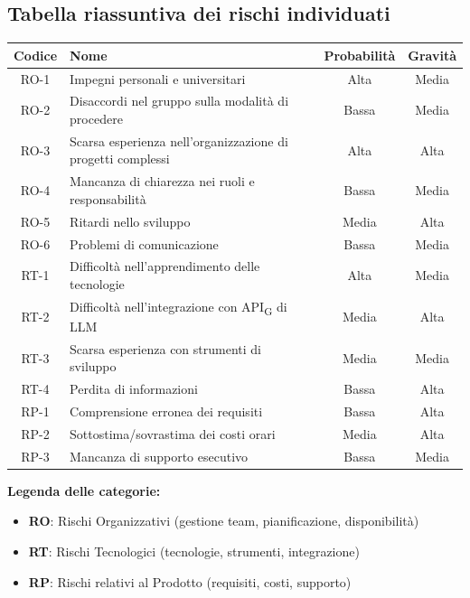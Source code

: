 \documentclass[11pt,a4paper]{article}
\newcommand{\gls}[1]{#1\textsubscript{G}}
\begin{document}
\subsection{Tabella riassuntiva dei rischi individuati}
\begin{center}
    \begin{tabular}{|c|l|c|c|}
        \hline
        \textbf{Codice} & \textbf{Nome} & \textbf{Probabilità} & \textbf{Gravità} \\
        \hline
        RO-1 & Impegni personali e universitari & Alta & Media \\
        \hline
        RO-2 & Disaccordi nel gruppo sulla modalità di procedere & Bassa & Media \\
        \hline
        RO-3 & Scarsa esperienza nell'organizzazione di progetti complessi & Alta & Alta \\
        \hline
        RO-4 & Mancanza di chiarezza nei ruoli e responsabilità & Bassa & Media \\
        \hline
        RO-5 & Ritardi nello sviluppo & Media & Alta \\
        \hline
        RO-6 & Problemi di comunicazione & Bassa & Media \\
        \hline
        RT-1 & Difficoltà nell'apprendimento delle tecnologie & Alta & Media \\
        \hline
        RT-2 & Difficoltà nell'integrazione con \gls{API} di LLM & Media & Alta \\
        \hline
        RT-3 & Scarsa esperienza con strumenti di sviluppo & Media & Media \\
        \hline
        RT-4 & Perdita di informazioni & Bassa & Alta \\
        \hline
        RP-1 & Comprensione erronea dei requisiti & Bassa & Alta \\
        \hline
        RP-2 & Sottostima/sovrastima dei costi orari & Media & Alta \\
        \hline
        RP-3 & Mancanza di supporto esecutivo & Bassa & Media \\
        \hline
    \end{tabular}
\end{center}

\textbf{Legenda delle categorie:}
\begin{itemize}
    \item \textbf{RO}: Rischi Organizzativi (gestione team, pianificazione, disponibilità)
    \item \textbf{RT}: Rischi Tecnologici (tecnologie, strumenti, integrazione)
    \item \textbf{RP}: Rischi relativi al Prodotto (requisiti, costi, supporto)
\end{itemize}
\end{document}
